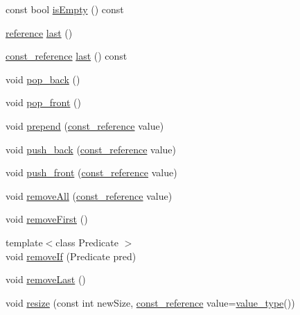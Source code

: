 \begin{DoxyCompactItemize}
\item 
const bool \hyperlink{classprism_1_1_list_a7cbe32ef6d447cc36d004da93df4da12}{is\+Empty} () const 
\item 
\hyperlink{classprism_1_1_list_a87113fe9cf2580e395e3d9f2962f4e81}{reference} \hyperlink{classprism_1_1_list_a674a1f2acb2580b63ec54964334721dd}{last} ()
\item 
\hyperlink{classprism_1_1_list_a31c013c3f9135c28c3c4bf489fbeb322}{const\+\_\+reference} \hyperlink{classprism_1_1_list_abb8f4bd3584cf4bafe29d250a767021c}{last} () const 
\item 
void \hyperlink{classprism_1_1_list_a22f54a3db3eedf861270b833862fef46}{pop\+\_\+back} ()
\item 
void \hyperlink{classprism_1_1_list_aa469f22e4ccc944268f984258e680ca3}{pop\+\_\+front} ()
\item 
void \hyperlink{classprism_1_1_list_a1c1a0dd2a6218345b50b119deb962813}{prepend} (\hyperlink{classprism_1_1_list_a31c013c3f9135c28c3c4bf489fbeb322}{const\+\_\+reference} value)
\item 
void \hyperlink{classprism_1_1_list_adf9bf40a902b9628c1f1f07f1e7518d9}{push\+\_\+back} (\hyperlink{classprism_1_1_list_a31c013c3f9135c28c3c4bf489fbeb322}{const\+\_\+reference} value)
\item 
void \hyperlink{classprism_1_1_list_ad8612f5facddec737ddaa81ab6c9cec6}{push\+\_\+front} (\hyperlink{classprism_1_1_list_a31c013c3f9135c28c3c4bf489fbeb322}{const\+\_\+reference} value)
\item 
void \hyperlink{classprism_1_1_list_a145f3905ff40c221d95cb858943aa8a6}{remove\+All} (\hyperlink{classprism_1_1_list_a31c013c3f9135c28c3c4bf489fbeb322}{const\+\_\+reference} value)
\item 
void \hyperlink{classprism_1_1_list_a8a80ca6c53cc3b6cde47b5b11ee4c1aa}{remove\+First} ()
\item 
{\footnotesize template$<$class Predicate $>$ }\\void \hyperlink{classprism_1_1_list_a0cab3235676030fbd9b238be252fb2c9}{remove\+If} (Predicate pred)
\item 
void \hyperlink{classprism_1_1_list_a7b9878e43f08ed5ca8379703342d1f02}{remove\+Last} ()
\item 
void \hyperlink{classprism_1_1_list_a4119f722dcf464610fbfa45b51247912}{resize} (const int new\+Size, \hyperlink{classprism_1_1_list_a31c013c3f9135c28c3c4bf489fbeb322}{const\+\_\+reference} value=\hyperlink{classprism_1_1_list_a3e9cab77c935e6bc2e96bcb00006382e}{value\+\_\+type}())
\item 

\end{DoxyCompactItemize}
